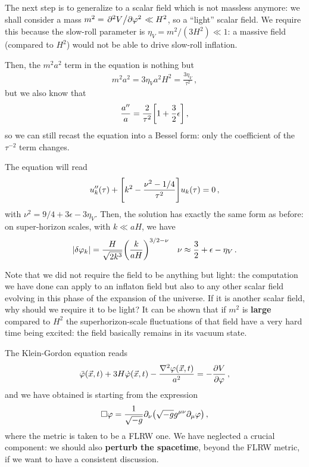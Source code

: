 \documentclass[main.tex]{subfiles}
\begin{document}
The next step is to generalize to a scalar field which is not massless anymore: we shall consider a mass \(m^2 = \pdv*[2]{V}{\varphi } \ll H^2\), so a ``light'' scalar field. 
We require this because the slow-roll parameter is \(\eta _V = m^2 / (3 H^2) \ll 1\): a massive field (compared to \(H^2\)) would not be able to drive slow-roll inflation. 

Then, the \(m^2 a^2\) term in the equation is nothing but 
%
\begin{align}
m^2 a^2 = 3 \eta _V a^2 H^2 = \frac{3 \eta _V}{\tau^2}
\,,
\end{align}
%
but we also know that 
%
\begin{align}
\frac{a''}{a} = \frac{2}{\tau^2 } \qty[ 1 + \frac{3}{2} \epsilon ]
\,,
\end{align}
%
so we can still recast the equation into a Bessel form: only the coefficient of the \(\tau^{-2}\) term changes. 

The equation will read 
%
\begin{align}
u''_k (\tau ) + \qty[ k^2 - \frac{\nu^2 - 1/4}{\tau^2}] u_k (\tau ) = 0
\,,
\end{align}
%
with \(\nu^2 = 9/4 + 3 \epsilon - 3 \eta _V\). 
Then, the solution has exactly the same form as before: on super-horizon scales, with \(k \ll aH\), we have
%
\begin{align}
\abs{ \delta \varphi _k} = \frac{H}{\sqrt{2 k^3}} \qty( \frac{k}{aH})^{3/2 - \nu }
&&
\nu \approx \frac{3}{2} + \epsilon - \eta _V
\,.
\end{align}

Note that we did not require the field to be anything but light: the computation we have done can apply to an inflaton field but also to any other scalar field evolving in this phase of the expansion of the universe. 
If it is another scalar field, why should we require it to be light? It can be shown that if \(m^2\) is \textbf{large} compared to \(H^2\) the superhorizon-scale fluctuations of that field have a very hard time being excited: the field basically remains in its vacuum state. 


The Klein-Gordon equation reads 
%
\begin{align}
\ddot{\varphi} (\vec{x}, t)
+ 3 H \dot{\varphi} (\vec{x}, t)
- \frac{\nabla^2 \varphi (\vec{x},t)}{a^2}
= - \pdv{V}{\varphi }
\,,
\end{align}
%
and we have obtained is starting from the expression 
%
\begin{align}
\square \varphi = \frac{1}{\sqrt{-g}} \partial_{\nu } \qty(\sqrt{-g} g^{\mu \nu } \partial_{\mu } \varphi )
\,,
\end{align}
%
where the metric is taken to be a FLRW one. We have neglected a crucial component: we should also \textbf{perturb the spacetime}, beyond the FLRW metric, if we want to have a consistent discussion. 
\end{document}
